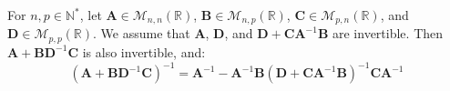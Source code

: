 \begin{proposition}\label{th:Woodbury}
	For $n,p\in\mathbb{N}^*$, let $\mathbf{A}\in\mathcal{M}_{n,n}(\mathbb{R})$, $\mathbf{B}\in\mathcal{M}_{n,p}(\mathbb{R})$, $\mathbf{C}\in\mathcal{M}_{p,n}(\mathbb{R})$, and $\mathbf{D}\in\mathcal{M}_{p,p}(\mathbb{R})$. We assume that $\mathbf{A}$, $\mathbf{D}$, and $\mathbf{D}+\mathbf{C}\mathbf{A}^{-1}\mathbf{B}$ are invertible. Then $\mathbf{A}+\mathbf{B}\mathbf{D}^{-1}\mathbf{C}$ is also invertible, and:
	\begin{equation}
		\left(\mathbf{A}+\mathbf{B}\mathbf{D}^{-1}\mathbf{C}\right)^{-1}=\mathbf{A}^{-1}-\mathbf{A}^{-1}\mathbf{B}\left(\mathbf{D}+\mathbf{C}\mathbf{A}^{-1}\mathbf{B}\right)^{-1}\mathbf{C}\mathbf{A}^{-1}
	\end{equation}
\end{proposition}

